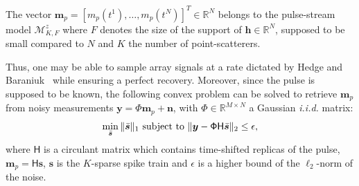 \documentclass{article}
\newcommand{\vect}[1]{\bm{#1}}
\newcommand{\mat}[1]{\mathsf{#1}}
\newcommand{\ser}[2]{#1^{#2}}
\theoremstyle{definition}
\begin{document}
The vector $\vect{m}_p = \left[m_p\left(\ser{t}{1}\right),\dots,m_p\left(\ser{t}{N}\right)\right]^T \in \mathbb{R}^N$ belongs to the pulse-stream model $\mathcal{M}^z_{K,F}$ where $F$ denotes the size of the support of $\vect{h} \in \mathbb{R}^N$, supposed to be small compared to $N$ and $K$ the number of point-scatterers.

Thus, one may be able to sample array signals at a rate dictated by Hedge and Baraniuk~\cite{Hedge_TSP_2011} while ensuring a perfect recovery. Moreover, since the pulse is supposed to be known, the following convex problem can be solved to retrieve $\vect{m}_p$ from noisy measurements $\vect{y} = \mathsf{\Phi} \vect{m}_p + \vect{n}$, with $\mathsf{\Phi} \in \mathbb{R}^{M \times N}$ a Gaussian \textit{i.i.d.} matrix:
\begin{equation}
\label{eq_l1_BPDN}
\min_{\bar{\vect{s}}}\|\bar{\vect{s}}\|_{1}
\textnormal{ subject to }\| \bm{y}-\mat{\Phi H}\bar{\vect{s}}\|_{2}\leq\epsilon,
\end{equation}
where $\mat{H}$ is a circulant matrix which contains time-shifted replicas of the pulse, $\vect{m}_p = \mat{H} \vect{s}$, $\vect{s}$ is the $K$-sparse spike train and $\epsilon$ is a higher bound of the $\ell_2$-norm of the noise.
\end{document}
